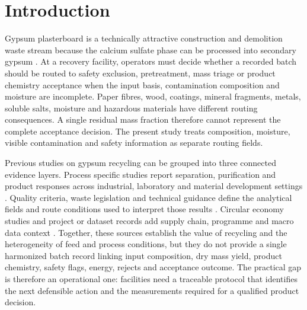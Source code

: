 \documentclass[pdflatex,sn-basic]{sn-jnl}
\begin{document}
\section{Introduction}\label{introduction}

Gypsum plasterboard is a technically attractive construction and demolition waste stream because the calcium sulfate phase can be processed into secondary gypsum \citep{jimenezRivero2016,jimenezRivero2017Factors,pantini2019,morsali2024,cristobal2024,iso14040,iso14044}. At a recovery facility, operators must decide whether a recorded batch should be routed to safety exclusion, pretreatment, mass triage or product chemistry acceptance when the input basis, contamination composition and moisture are incomplete. Paper fibres, wood, coatings, mineral fragments, metals, soluble salts, moisture and hazardous materials have different routing consequences. A single residual mass fraction therefore cannot represent the complete acceptance decision. The present study treats composition, moisture, visible contamination and safety information as separate routing fields.

Previous studies on gypsum recycling can be grouped into three connected evidence layers. Process specific studies report separation, purification and product responses across industrial, laboratory and material development settings \citep{jimenezRivero2017Best,pedrenoRojas2020,weimann2021,castroDiaz2024Acid,castroDiaz2024Wastewater,castroDiaz2023Dataset,perezGalvez2025,pedrenoRojas2025Wood,capasso2025,castroDiaz2023Preprint,atienza2025,jimenezRivero2017Characterization,rodrigoBravo2025,nowak2024,mizuishi2026}. Quality criteria, waste legislation and technical guidance define the analytical fields and route conditions used to interpret those results \citep{eurogypsum2024,bundesverband2013,en15936_2022,eu2008WasteDirective,eu2024WasteShipments,reetsch2024,jrcEndOfWaste,tris2025,ec2024EndWasteMetadata,ec2020Bemp,jrcCdw,ecWasteFramework,deloitte2017}. Circular economy studies and project or dataset records add supply chain, programme and macro data context \citep{mhlanga2025Business,mhlanga2025Implementation,lifeGypsumProject,eurostatW121,eurostatEnergyPrices,jrcElectricityFactors,cineA_GtoG}. Together, these sources establish the value of recycling and the heterogeneity of feed and process conditions, but they do not provide a single harmonized batch record linking input composition, dry mass yield, product chemistry, safety flags, energy, rejects and acceptance outcome. The practical gap is therefore an operational one: facilities need a traceable protocol that identifies the next defensible action and the measurements required for a qualified product decision.
\end{document}
